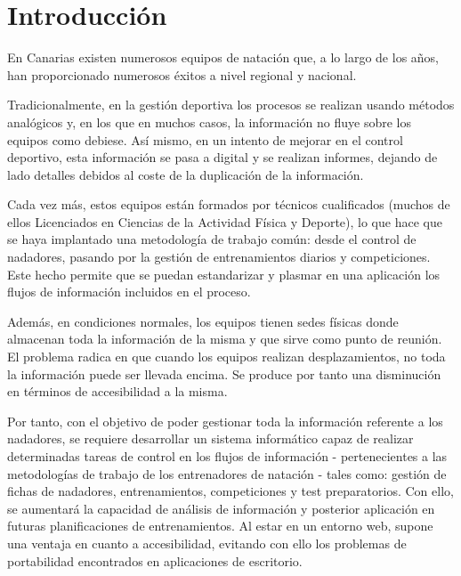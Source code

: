%
%
%

\chapter[Introducción]{
	Introducción
}

	En Canarias existen numerosos equipos de natación que, a lo largo de los años, han proporcionado numerosos éxitos a nivel regional y nacional. 

	Tradicionalmente, en la gestión deportiva los procesos se realizan usando métodos analógicos y, en los que en muchos casos, la información no fluye sobre los equipos como debiese. Así mismo, en un intento de mejorar en el control deportivo, esta información se pasa a digital y se realizan informes, dejando de lado detalles debidos al coste de la duplicación de la información.

	Cada vez más, estos equipos están formados por técnicos cualificados (muchos de ellos Licenciados en Ciencias de la Actividad Física y Deporte), lo que hace que se haya implantado una metodología de trabajo común: desde el control de nadadores, pasando por la gestión de entrenamientos diarios y competiciones. Este hecho permite que se puedan estandarizar y plasmar en una aplicación los flujos de información incluidos en el proceso.

	Además, en condiciones normales, los equipos tienen sedes físicas donde almacenan toda la información de la misma y que sirve como punto de reunión. El problema radica en que cuando los equipos realizan desplazamientos, no toda la información puede ser llevada encima. Se produce por tanto una disminución en términos de accesibilidad a la misma.

	Por tanto, con el objetivo de poder gestionar toda la información referente a los nadadores, se requiere desarrollar un sistema informático capaz de realizar determinadas tareas de control en los flujos de información - pertenecientes a las metodologías de trabajo de los entrenadores de natación - tales como: gestión de fichas de nadadores, entrenamientos, competiciones y test preparatorios. Con ello, se aumentará la capacidad de análisis de información y posterior aplicación en futuras planificaciones de entrenamientos. Al estar en un entorno web, supone una ventaja en cuanto a accesibilidad, evitando con ello los problemas de portabilidad encontrados en aplicaciones de escritorio.

